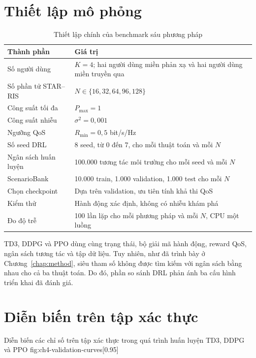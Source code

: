\section{Thiết lập mô phỏng}
\begin{table}[H]
\caption{Thiết lập chính của benchmark sáu phương pháp}
\label{tab:simulation-setup}
\begin{tabularx}{\textwidth}{p{5.1cm}Y}
\toprule
\textbf{Thành phần} & \textbf{Giá trị}\tabularnewline
\midrule
Số người dùng & $K=4$; hai người dùng miền phản xạ và hai người dùng miền truyền qua\\
Số phần tử STAR--RIS & $N\in\{16,32,64,96,128\}$\\
Công suất tối đa & $P_{\max}=1$\\
Công suất nhiễu & $\sigma^2=0{,}001$\\
Ngưỡng QoS & $R_{\min}=0{,}5$ bit/s/Hz\\
Số seed DRL & 8 seed, từ 0 đến 7, cho mỗi thuật toán và mỗi $N$\\
Ngân sách huấn luyện & 100.000 tương tác môi trường cho mỗi seed và mỗi $N$\\
ScenarioBank & 10.000 train, 1.000 validation, 1.000 test cho mỗi $N$\\
Chọn checkpoint & Dựa trên validation, ưu tiên tính khả thi QoS\\
Kiểm thử & Hành động xác định, không có nhiễu khám phá\\
Đo độ trễ & 100 lần lặp cho mỗi phương pháp và mỗi $N$, CPU một luồng\\
\bottomrule
\end{tabularx}
\end{table}

TD3, DDPG và PPO dùng cùng trạng thái, bộ giải mã hành động, reward QoS, ngân sách tương tác và tập dữ liệu. Tuy nhiên, như đã trình bày ở Chương~\ref{chap:method}, siêu tham số không được tìm kiếm với ngân sách bằng nhau cho cả ba thuật toán. Do đó, phần so sánh DRL phản ánh ba cấu hình triển khai đã đánh giá.

\section{Diễn biến trên tập xác thực}
{Diễn biến các chỉ số trên tập xác thực trong quá trình huấn luyện TD3, DDPG và PPO}
{fig:ch4-validation-curves}[0.95\linewidth]

